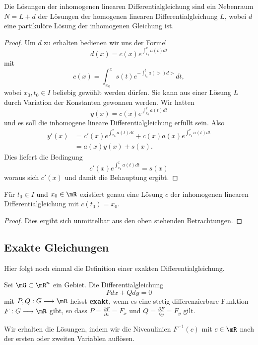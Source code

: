 \documentclass[%
draft,
11pt,%
twoside,%
titlepage,%
german,%
headsepline%
]{scrartcl}
\begin{document}
\begin{satz}
Die L\"osungen der inhomogenen linearen Differentialgleichung sind ein Nebenraum $N=L+d$ der L\"osungen der homogenen linearen Differentialgleichung $L$, wobei $d$ eine partikul\"ore L\"osung der inhomogenen Gleichung ist.
\end{satz}

\begin{proof}
Um $d$ zu erhalten bedienen wir uns der Formel
$$d(x)=c(x)e^{\int_{x_0}^xa(t)dt}$$
mit
$$c(x)=\int_{x_0}^xs(t)e^{-\int_{t_0}^ta(\gt)d\gt}dt,$$
wobei $x_0,t_0\in I$ beliebig gew\"ohlt werden d\"urfen.
Sie kann aus einer L\"osung $L$ durch Variation der Konstanten gewonnen werden. Wir hatten
$$y(x)=c(x)e^{\int_{x_0}^xa(t)dt}$$
und es soll die inhomogene lineare Differentialgleichung erf\"ullt sein. Also
\begin{align*}
y'(x) &=c'(x)e^{\int_{x_0}^xa(t)dt}+c(x)a(x)e^{\int_{x_0}^xa(t)dt}\\
&=a(x)y(x)+s(x).
\end{align*}
Dies liefert die Bedingung
$$c'(x)e^{\int_{x_0}^xa(t)dt}=s(x)$$
woraus sich $c'(x)$ und damit die Behauptung ergibt.
\end{proof}

\begin{kor}
F\"ur $t_0\in I$ und $x_0\in\mR$ existiert genau eine L\"osung $c$ der inhomogenen linearen Differentialgleichung mit $c(t_0)=x_0$.
\end{kor}

\begin{proof}
Dies ergibt sich unmittelbar aus den oben stehenden Betrachtungen.
\end{proof}

\subsection{Exakte Gleichungen}

Hier folgt noch einmal die Definition einer exakten Differentialgleichung.
\begin{defn}
Sei
$\mG\subset\mR^n$ ein Gebiet. Die Differentialgleichung
$$Pdx+Qdy=0$$
mit $P,Q:G\longrightarrow\mR$ heisst \textbf{exakt}, wenn es eine stetig differenzierbare Funktion $F:G\longrightarrow\mR$ gibt, so dass $P=\frac{\partial F}{\partial x}=F_x$ und $Q=\frac{\partial F}{\partial y}=F_y$ gilt.
\end{defn}
\noindent Wir erhalten die L\"osungen, indem wir die Niveaulinien $F^{-1}(c)$ mit $c\in\mR$ nach der ersten oder zweiten Variablen aufl\"osen.
\end{document}
